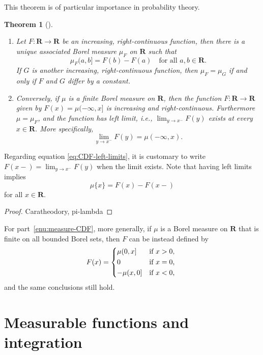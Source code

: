 \documentclass[10pt,oneside]{book}
\numberwithin{equation}{chapter}
\theoremstyle{plain-star}
\newtheorem{thm}[equation]{Theorem}
\theoremstyle{definition-star}
\theoremstyle{remark-star}
\theoremstyle{plain-star}
\newcommand{\R}{\mathbf{R}}
\begin{document}
This theorem is of particular importance in probability theory.

\begin{thm}[{\cite[Theorem~1.16]{folland1999}}] \label{thm:increasing-rcont-Borel-measure-connection} \leavevmode
    \begin{enumerate}
        \item \label{enu:CDF-measure} Let $F\colon \R \to \R$ be an increasing, right-continuous function, then there is a unique associated Borel measure $\mu_F$ on $\R$ such that \[
        \mu_F(a,b] = F(b) - F(a)\quad \text{for all }a,b\in \R.
    \] If $G$ is another increasing, right-continuous function, then $\mu_F = \mu_G$ if and only if $F$ and $G$ differ by a constant.
        \item \label{enu:measure-CDF} Conversely, if $\mu$ is a finite Borel measure on $\R$, then the function $F\colon \R \to \R$ given by $F(x) = \mu(-\infty,x]$ is increasing and right-continuous. Furthermore $\mu = \mu_F$, and the function has left limit, i.e., $\lim_{y \to x^-} F(y)$ exists at every $x \in \R$. More specifically, \begin{equation} \label{eq:CDF-left-limits}
             \lim_{y \to x^-} F(y) = \mu(-\infty,x).
        \end{equation}
    \end{enumerate}
\end{thm}

Regarding equation \eqref{eq:CDF-left-limits}, it is customary to write $F(x-) = \lim_{y \to x^-} F(y)$ when the limit exists. Note that having left limits implies \[\mu\{x\} = F(x) - F(x-)\] for all $x \in \R$.

\begin{proof}
    Caratheodory, pi-lambda
\end{proof}

    For part~\ref{enu:measure-CDF}, more generally, if $\mu$ is a Borel measure on $\R$ that is finite on all bounded Borel sets, then $F$ can be instead defined by \[
        F(x) = \begin{cases*}
            \mu (0,x] & if $x > 0$, \\
            0 & if $x = 0$, \\
            -\mu(x,0] & if $x < 0$,
        \end{cases*}
    \] and the same conclusions still hold.

\chapter{Measurable functions and integration}
\end{document}
